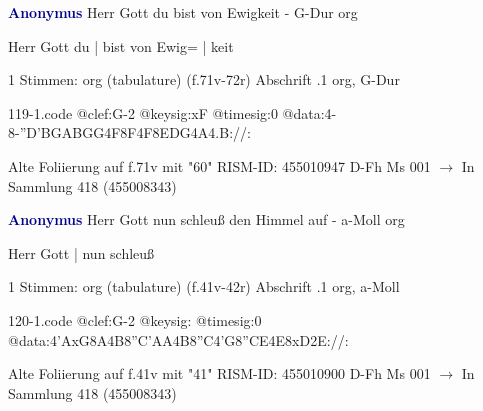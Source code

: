 \documentclass[twocolumn]{book}
\begin{document}
\newline \par \vspace{7pt} \textcolor{darkblue}{\textbf{Anonymus  }}
\newline Herr Gott du bist von Ewigkeit - G-Dur
\newline org
\newline \begin{itshape}[f.71v, at left:] Herr Gott du | bist von Ewig= | keit\end{itshape} 
\newline \textcolor{darkblue}{}  1 Stimmen: org (tabulature)  (f.71v-72r)
\newline Abschrift
.1  org, G-Dur  
\begin{filecontents*}{119-1.code}
@clef:G-2
@keysig:xF
@timesig:0
@data:4-8-''D{'BGAB}{GG}4F8F4F8E{DG}4A4.B://:
\end{filecontents*}
\newline
%
\newline Alte Foliierung auf f.71v mit "60"
\newline RISM-ID: 455010947
\newline D-Fh  Ms 001
\newline $\rightarrow$ In Sammlung 418 (455008343)
      
\newline \par \vspace{7pt} \textcolor{darkblue}{\textbf{Anonymus  }}
\newline Herr Gott nun schleuß den Himmel auf - a-Moll
\newline org
\newline \begin{itshape}[f.41v, at left:] Herr Gott | nun schleuß\end{itshape} 
\newline \textcolor{darkblue}{}  1 Stimmen: org (tabulature)  (f.41v-42r)
\newline Abschrift
.1  org, a-Moll  
\begin{filecontents*}{120-1.code}
@clef:G-2
@keysig:
@timesig:0
@data:4'AxG8A4B8''C{'AA}4B8''C4'G8''CE4E8xD2E://:
\end{filecontents*}
\newline
%
\newline Alte Foliierung auf f.41v mit "41"
\newline RISM-ID: 455010900
\newline D-Fh  Ms 001
\newline $\rightarrow$ In Sammlung 418 (455008343)
      
\end{document}
